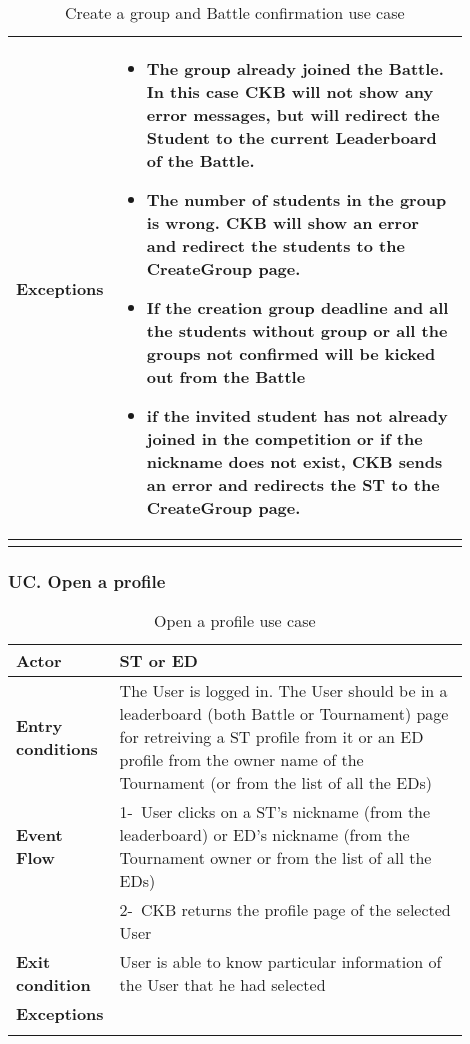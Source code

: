 \begin{center}
\begin{longtable}{|l|p{0.9\linewidth}|}
        \textbf{Exceptions}        & \begin{itemize}
            \item The group already joined the Battle. In this case CKB will not show any error messages, but will redirect the Student to the current Leaderboard of the Battle.
            \item The number of students in the group is wrong. CKB will show an error and redirect the students to the CreateGroup page.
            \item If the creation group deadline and all the students without group or all the groups not confirmed will be kicked out from the Battle
            \item if the invited student has not already joined in the competition or if the nickname does not exist, CKB sends an error and redirects the ST to the CreateGroup page.
         \end{itemize}    \\
        \hline
        \caption{Create a group and Battle confirmation use case}
        \label{tab: create_a_group_and_Battle_confirmation_use_case}
    \end{longtable}
\end{center}

\subsubsection*{UC\cuc . Open a profile}
\begin{center}
    \begin{longtable}{|l|p{0.9\linewidth}|}
        \hline
        \textbf{Actor}            & ST or ED                                                                                                                                                                                       \\
        \hline
        \textbf{Entry conditions} & The User is logged in. The User should be in a leaderboard (both Battle or Tournament) page for retreiving a ST profile from it or an ED profile from the owner name of the Tournament (or from the list of all the EDs)        \\
        \hline
        \textbf{Event Flow}       & 1-\ User clicks on a ST's nickname (from the leaderboard) or ED's nickname (from the Tournament owner or from the list of all the EDs)        \\
        & 2-\ CKB returns the profile page of the selected User        \\
        \hline
        \textbf{Exit condition}   & User is able to know particular information of the User that he had selected        \\
        \hline
        \textbf{Exceptions}        &  \\%
        \hline
        \caption{Open a profile use case}
        \label{tab: open_a_profile_use_case}
    \end{longtable}
\end{center}

